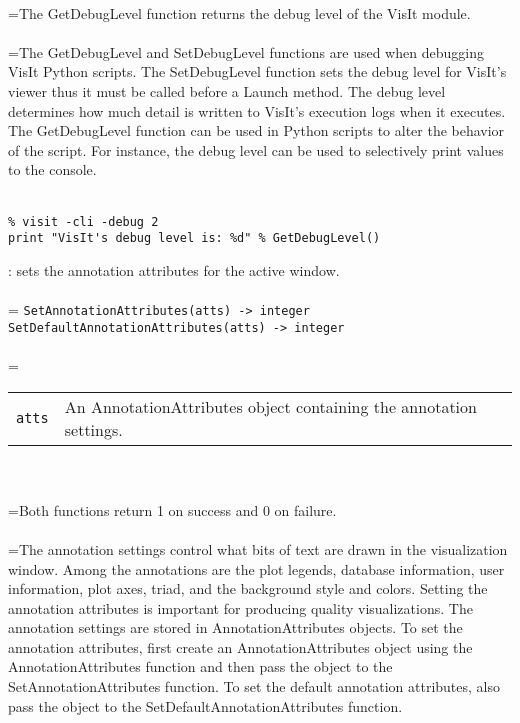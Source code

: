 \documentclass[10pt,a4paper]{report}
\begin{document}
 \\ 
\hangindent=\parindent The GetDebugLevel function returns the debug level of the VisIt module. \\[-3mm] 

 \\ 
\hangindent=\parindent The GetDebugLevel and SetDebugLevel functions are used when debugging VisIt Python scripts. The SetDebugLevel function sets the debug level for VisIt's viewer thus it must be called before a Launch method. The debug level determines how much detail is written to VisIt's execution logs when it executes. The GetDebugLevel function can be used in Python scripts to alter the behavior of the script. For instance, the debug level can be used to selectively print values to the console. \\[-3mm] 

\\[-6mm]
\begin{verbatim}% visit -cli -debug 2
print "VisIt's debug level is: %d" % GetDebugLevel()
\end{verbatim}
\newpage


{}
: sets the annotation attributes for the active window.\\[-3mm]

 \\ 
\hangindent=\parindent 
\verb!SetAnnotationAttributes(atts) -> integer!\\ 
\verb!SetDefaultAnnotationAttributes(atts) -> integer!\\ [-3mm]

 \\ 
\hangindent=\parindent 
\begin{tabular}{lp{9cm}}
\verb!atts! & An AnnotationAttributes object containing the annotation settings. \\
\end{tabular} \\[-2mm]


 \\ 
\hangindent=\parindent Both functions return 1 on success and 0 on failure. \\[-3mm] 

 \\ 
\hangindent=\parindent The annotation settings control what bits of text are drawn in the visualization window. Among the annotations are the plot legends, database information, user information, plot axes, triad, and the background style and colors. Setting the annotation attributes is important for producing quality visualizations. The annotation settings are stored in AnnotationAttributes objects. To set the annotation attributes, first create an AnnotationAttributes object using the AnnotationAttributes function and then pass the object to the SetAnnotationAttributes function. To set the default annotation attributes, also pass the object to the SetDefaultAnnotationAttributes function. \\[-3mm] 
\end{document}
